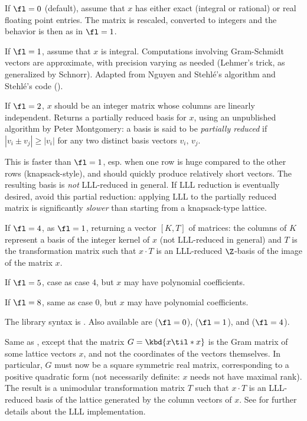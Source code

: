 If $\fl=0$ (default), assume that $x$ has either exact (integral or
rational) or real floating point entries. The matrix is rescaled, converted
to integers and the behavior is then as in $\fl = 1$.

If $\fl=1$, assume that $x$ is integral. Computations involving Gram-Schmidt
vectors are approximate, with precision varying as needed (Lehmer's trick,
as generalized by Schnorr). Adapted from Nguyen and Stehl\'e's algorithm
and Stehl\'e's code ().

If $\fl=2$, $x$ should be an integer matrix whose columns are linearly
independent. Returns a partially reduced basis for $x$, using an unpublished
algorithm by Peter Montgomery: a basis is said to be \emph{partially reduced}
if $|v_i \pm v_j| \geq |v_i|$ for any two distinct basis vectors $v_i, \,
v_j$.

This is faster than $\fl=1$, esp. when one row is huge compared
to the other rows (knapsack-style), and should quickly produce relatively
short vectors. The resulting basis is \emph{not} LLL-reduced in general.
If LLL reduction is eventually desired, avoid this partial reduction:
applying LLL to the partially reduced matrix is significantly \emph{slower}
than starting from a knapsack-type lattice.

If $\fl=4$, as $\fl=1$, returning a vector $[K, T]$ of matrices: the
columns of $K$ represent a basis of the integer kernel of $x$
(not LLL-reduced in general) and $T$ is the transformation
matrix such that $x\cdot T$ is an LLL-reduced $\Z$-basis of the image
of the matrix $x$.

If $\fl=5$, case as case $4$, but $x$ may have polynomial coefficients.

If $\fl=8$, same as case $0$, but $x$ may have polynomial coefficients.

The library syntax is .
Also available are  ($\fl=0$),
 ($\fl=1$), and  ($\fl=4$).

\label{se:qflllgram}
Same as , except that the
matrix $G = \kbd{x\til * x}$ is the Gram matrix of some lattice vectors $x$,
and not the coordinates of the vectors themselves. In particular, $G$ must
now be a square symmetric real matrix, corresponding to a positive
quadratic form (not necessarily definite: $x$ needs not have maximal rank).
The result is a unimodular
transformation matrix $T$ such that $x \cdot T$ is an LLL-reduced basis of
the lattice generated by the column vectors of $x$. See  for
further details about the LLL implementation.

